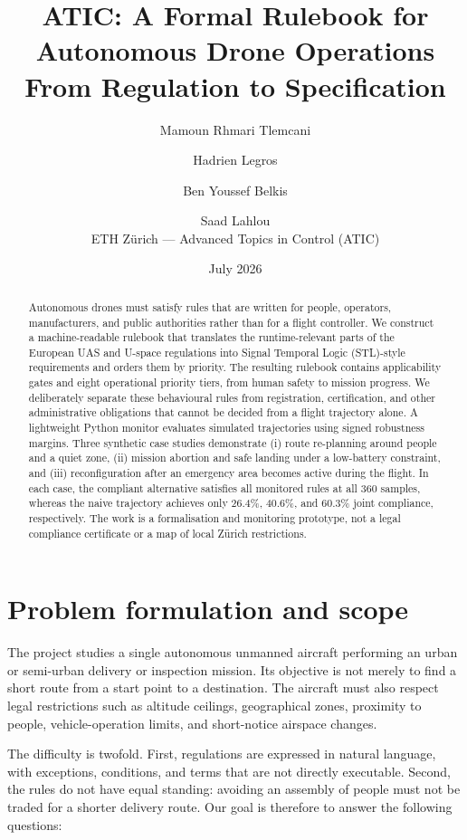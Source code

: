 \documentclass[11pt,a4paper]{article}
\title{\textbf{ATIC: A Formal Rulebook for Autonomous Drone Operations}\\
\large From Regulation to Specification}
\author{Mamoun Rhmari Tlemcani \and Hadrien Legros \and Ben Youssef Belkis \and Saad Lahlou\\[0.4em]
\normalsize ETH Z\"urich --- Advanced Topics in Control (ATIC)}
\date{July 2026}
\begin{document}
\maketitle

\begin{abstract}
Autonomous drones must satisfy rules that are written for people, operators, manufacturers, and public authorities rather than for a flight controller. We construct a machine-readable rulebook that translates the runtime-relevant parts of the European UAS and U-space regulations into Signal Temporal Logic (STL)-style requirements and orders them by priority. The resulting rulebook contains applicability gates and eight operational priority tiers, from human safety to mission progress. We deliberately separate these behavioural rules from registration, certification, and other administrative obligations that cannot be decided from a flight trajectory alone. A lightweight Python monitor evaluates simulated trajectories using signed robustness margins. Three synthetic case studies demonstrate (i) route re-planning around people and a quiet zone, (ii) mission abortion and safe landing under a low-battery constraint, and (iii) reconfiguration after an emergency area becomes active during the flight. In each case, the compliant alternative satisfies all monitored rules at all 360 samples, whereas the naive trajectory achieves only 26.4\%, 40.6\%, and 60.3\% joint compliance, respectively. The work is a formalisation and monitoring prototype, not a legal compliance certificate or a map of local Z\"urich restrictions.
\end{abstract}

\section{Problem formulation and scope}

The project studies a single autonomous unmanned aircraft performing an urban or semi-urban delivery or inspection mission. Its objective is not merely to find a short route from a start point to a destination. The aircraft must also respect legal restrictions such as altitude ceilings, geographical zones, proximity to people, vehicle-operation limits, and short-notice airspace changes.

The difficulty is twofold. First, regulations are expressed in natural language, with exceptions, conditions, and terms that are not directly executable. Second, the rules do not have equal standing: avoiding an assembly of people must not be traded for a shorter delivery route. Our goal is therefore to answer the following questions:
\end{document}
